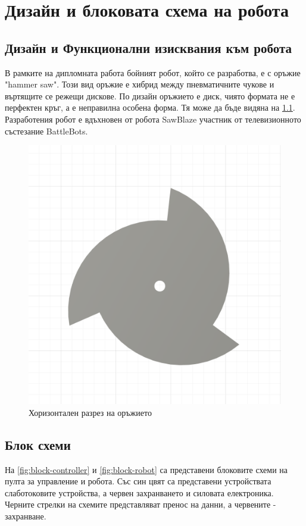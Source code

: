 \chapter{Дизайн и блоковата схема на робота}

\section{Дизайн и Функционални изисквания към робота}
\label{sec:requirements}

В рамките на дипломната работа бойният робот, който се разработва, е с оръжие "hammer saw". Този вид оръжие е хибрид между пневматичните чукове и въртящите се режещи дискове. По дизайн оръжието е диск, чиято формата не е перфектен кръг, а е неправилна особена форма. Тя може да бъде видяна на \cref{fig:disk}. Разработения робот е вдъхновен от робота SawBlaze участник от телевизионното състезание BattleBots.

\begin{figure}[H]
    \centering
    \includegraphics[width=0.6\linewidth]{images/disk.png}
    
    \caption{Хоризонтален разрез на оръжието}
    \label{fig:disk} 
\end{figure}


\section{Блок схеми}
\label{sec:block-schemas}

На \cref{fig:block-controller} и \cref{fig:block-robot} са представени блоковите схеми на пулта за управление и робота. Със син цвят са представени устройствата слаботоковите устройства, а червен захранването и силовата електроника. Черните стрелки на схемите представляват пренос на данни, а червените - захранване.

